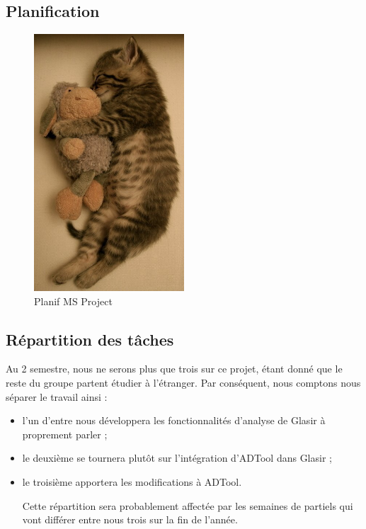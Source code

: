 	\subsection{Planification}
		\begin{figure}
			\begin{center}
				\includegraphics[width=0.5\textwidth]{figure/planif.jpg}
			\end{center}
			\caption{Planif MS Project}
			\label{fig:planif}
		\end{figure}


	\subsection{Répartition des tâches}
	Au 2 semestre, nous ne serons plus que trois sur ce projet, étant donné que le reste du groupe partent étudier à l'étranger. Par conséquent, nous comptons nous séparer le travail ainsi :
	\begin{itemize}
	\item l'un d'entre nous développera les fonctionnalités d'analyse de Glasir à proprement parler ;
	\item le deuxième se tournera plutôt sur l'intégration d'ADTool dans Glasir ;
	\item le troisième apportera les modifications à ADTool.
	
	Cette répartition sera probablement affectée par les semaines de partiels qui vont différer entre nous trois sur la fin de l'année.
	\end{itemize}

